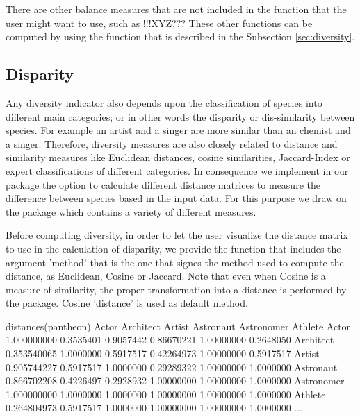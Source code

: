 There are other balance measures that are not included in the function  that the user might want to use, such as !!!XYZ??? These other functions can be computed by using the function  that is described in the Subsection \ref{sec:diversity}.


\subsection{Disparity}
Any diversity indicator also depends upon the classification of species into different main categories; or in other words the disparity or dis-similarity between species. For example an artist and a singer are more similar than an chemist and a singer. Therefore, diversity measures are also closely related to distance and similarity measures like Euclidean distances, cosine similarities, Jaccard-Index or expert classifications of different categories. In consequence we implement in our package the option to calculate different distance matrices to measure the difference between species based in the input data. For this purpose we draw on the package  which contains a variety of different measures. 

Before computing diversity, in order to let the user visualize the distance matrix to use in the calculation of disparity, we provide the function  that includes the argument 'method' that is the one that signes the method used to compute the distance, as Euclidean, Cosine or Jaccard. Note that even when Cosine is a measure of similarity, the proper transformation into a distance is performed by the  package. Cosine 'distance' is used as default method.

\begin{example}
 distances(pantheon)
                          Actor Architect    Artist  Astronaut Astronomer   Athlete
Actor               1.000000000 0.3535401 0.9057442 0.86670221 1.00000000 0.2648050
Architect           0.353540065 1.0000000 0.5917517 0.42264973 1.00000000 0.5917517
Artist              0.905744227 0.5917517 1.0000000 0.29289322 1.00000000 1.0000000
Astronaut           0.866702208 0.4226497 0.2928932 1.00000000 1.00000000 1.0000000
Astronomer          1.000000000 1.0000000 1.0000000 1.00000000 1.00000000 1.0000000
Athlete             0.264804973 0.5917517 1.0000000 1.00000000 1.00000000 1.0000000
...
\end{example}

